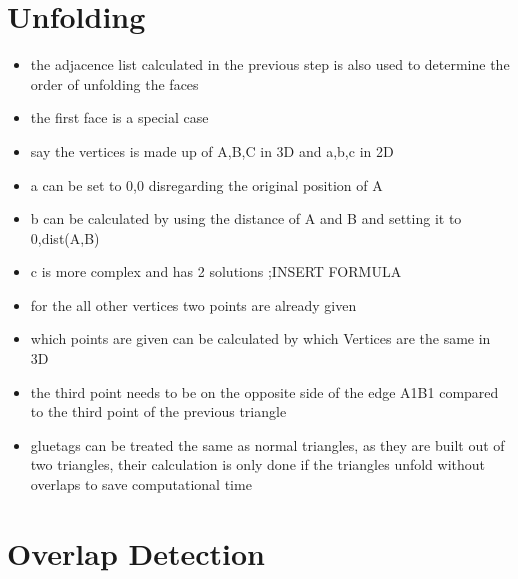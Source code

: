 \documentclass[draft,final]{vutinfth} %
\begin{document}
\section{Unfolding}

\begin{itemize}
	\item the adjacence list calculated in the previous step is also used to determine the order of unfolding the faces
	\item the first face is a special case
	\item say the vertices is made up of A,B,C in 3D and a,b,c in 2D
	\item a can be set to 0,0 disregarding the original position of A
	\item b can be calculated by using the distance of A and B and setting it to 0,dist(A,B)
	\item c is more complex and has 2 solutions ;INSERT FORMULA
	\item for the all other vertices two points are already given
	\item which points are given can be calculated by which Vertices are the same in 3D
	\item the third point needs to be on the opposite side of the edge A1B1 compared to the third point of the previous triangle
	\item gluetags can be treated the same as normal triangles, as they are built out of two triangles, their calculation is only done if the triangles unfold without overlaps to save computational time
\end{itemize}

\section{Overlap Detection}
\end{document}
